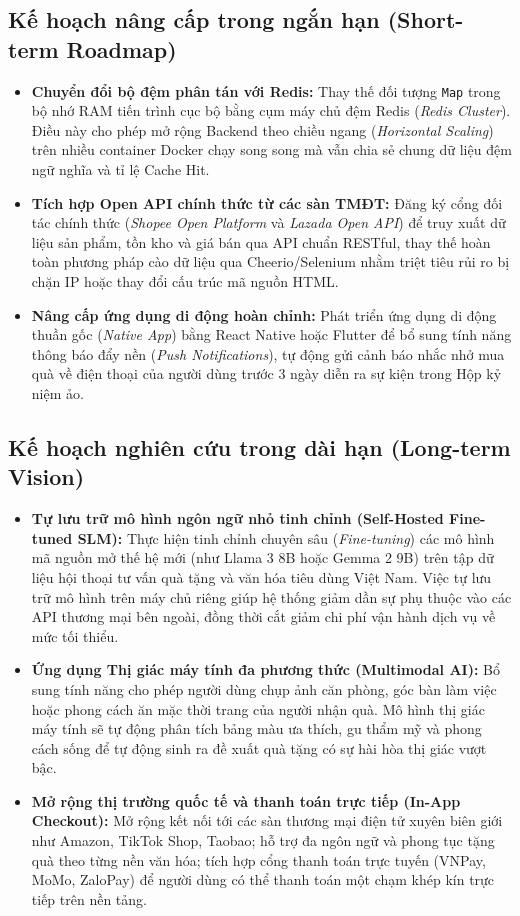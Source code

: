 \subsection{Kế hoạch nâng cấp trong ngắn hạn (Short-term Roadmap)}
\begin{itemize}
    \item \textbf{Chuyển đổi bộ đệm phân tán với Redis:} Thay thế đối tượng \texttt{Map} trong bộ nhớ RAM tiến trình cục bộ bằng cụm máy chủ đệm Redis (\textit{Redis Cluster}). Điều này cho phép mở rộng Backend theo chiều ngang (\textit{Horizontal Scaling}) trên nhiều container Docker chạy song song mà vẫn chia sẻ chung dữ liệu đệm ngữ nghĩa và tỉ lệ Cache Hit.
    \item \textbf{Tích hợp Open API chính thức từ các sàn TMĐT:} Đăng ký cổng đối tác chính thức (\textit{Shopee Open Platform} và \textit{Lazada Open API}) để truy xuất dữ liệu sản phẩm, tồn kho và giá bán qua API chuẩn RESTful, thay thế hoàn toàn phương pháp cào dữ liệu qua Cheerio/Selenium nhằm triệt tiêu rủi ro bị chặn IP hoặc thay đổi cấu trúc mã nguồn HTML.
    \item \textbf{Nâng cấp ứng dụng di động hoàn chỉnh:} Phát triển ứng dụng di động thuần gốc (\textit{Native App}) bằng React Native hoặc Flutter để bổ sung tính năng thông báo đẩy nền (\textit{Push Notifications}), tự động gửi cảnh báo nhắc nhở mua quà về điện thoại của người dùng trước 3 ngày diễn ra sự kiện trong Hộp kỷ niệm ảo.
\end{itemize}

\subsection{Kế hoạch nghiên cứu trong dài hạn (Long-term Vision)}
\begin{itemize}
    \item \textbf{Tự lưu trữ mô hình ngôn ngữ nhỏ tinh chỉnh (Self-Hosted Fine-tuned SLM):} Thực hiện tinh chỉnh chuyên sâu (\textit{Fine-tuning}) các mô hình mã nguồn mở thế hệ mới (như Llama 3 8B hoặc Gemma 2 9B) trên tập dữ liệu hội thoại tư vấn quà tặng và văn hóa tiêu dùng Việt Nam. Việc tự lưu trữ mô hình trên máy chủ riêng giúp hệ thống giảm dần sự phụ thuộc vào các API thương mại bên ngoài, đồng thời cắt giảm chi phí vận hành dịch vụ về mức tối thiểu.
    \item \textbf{Ứng dụng Thị giác máy tính đa phương thức (Multimodal AI):} Bổ sung tính năng cho phép người dùng chụp ảnh căn phòng, góc bàn làm việc hoặc phong cách ăn mặc thời trang của người nhận quà. Mô hình thị giác máy tính sẽ tự động phân tích bảng màu ưa thích, gu thẩm mỹ và phong cách sống để tự động sinh ra đề xuất quà tặng có sự hài hòa thị giác vượt bậc.
    \item \textbf{Mở rộng thị trường quốc tế và thanh toán trực tiếp (In-App Checkout):} Mở rộng kết nối tới các sàn thương mại điện tử xuyên biên giới như Amazon, TikTok Shop, Taobao; hỗ trợ đa ngôn ngữ và phong tục tặng quà theo từng nền văn hóa; tích hợp cổng thanh toán trực tuyến (VNPay, MoMo, ZaloPay) để người dùng có thể thanh toán một chạm khép kín trực tiếp trên nền tảng.
\end{itemize}

